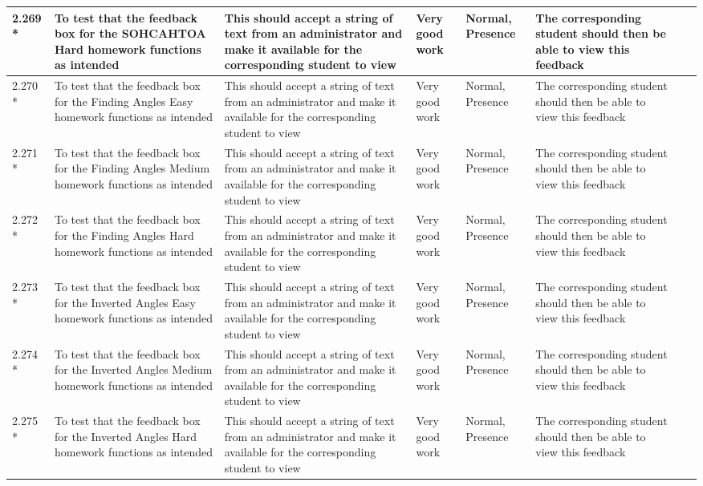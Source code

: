 \begin{landscape}
\begin{center}
\begin{longtable}{|p{1.5cm}|p{2.5cm}|p{2.5cm}|p{2cm}|p{2cm}|p{2cm}|p{2cm}|p{2cm}|}
2.269 * & To test that the feedback box for the SOHCAHTOA Hard homework functions as intended & This should accept a string of text from an administrator and make it available for the corresponding student to view & Very good work & Normal, Presence & The corresponding student should then be able to view this feedback & & \\ \hline
2.270 * & To test that the feedback box for the Finding Angles Easy homework functions as intended & This should accept a string of text from an administrator and make it available for the corresponding student to view & Very good work & Normal, Presence & The corresponding student should then be able to view this feedback & & \\ \hline
2.271 * & To test that the feedback box for the Finding Angles Medium homework functions as intended & This should accept a string of text from an administrator and make it available for the corresponding student to view & Very good work & Normal, Presence & The corresponding student should then be able to view this feedback & & \\ \hline
2.272 * & To test that the feedback box for the Finding Angles Hard homework functions as intended & This should accept a string of text from an administrator and make it available for the corresponding student to view & Very good work & Normal, Presence & The corresponding student should then be able to view this feedback & & \\ \hline
2.273 * & To test that the feedback box for the Inverted Angles Easy homework functions as intended & This should accept a string of text from an administrator and make it available for the corresponding student to view & Very good work & Normal, Presence & The corresponding student should then be able to view this feedback & & \\ \hline
2.274 * & To test that the feedback box for the Inverted Angles Medium homework functions as intended & This should accept a string of text from an administrator and make it available for the corresponding student to view & Very good work & Normal, Presence & The corresponding student should then be able to view this feedback & & \\ \hline
2.275 * & To test that the feedback box for the Inverted Angles Hard homework functions as intended & This should accept a string of text from an administrator and make it available for the corresponding student to view & Very good work & Normal, Presence & The corresponding student should then be able to view this feedback & & \\ \hline

\end{longtable}
\end{center}
\end{landscape}

